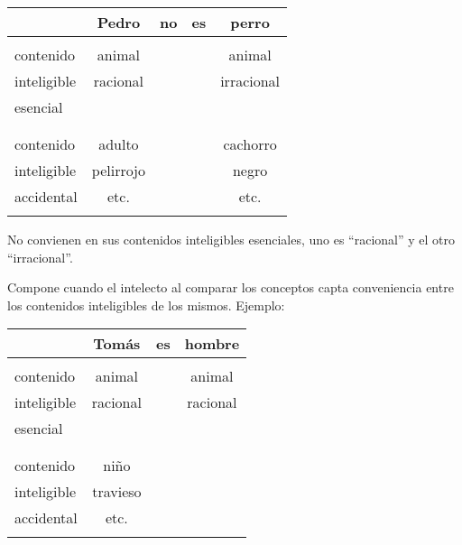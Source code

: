 \documentclass{article}
\begin{document}
    \begin{center}
    \begin{tabular}{|l|cccc|} \hline
                                 & Pedro     & no & es & perro      \\ \hline
                     &           &    &   &            \\ 
        contenido    & animal    &    &   & animal     \\
        inteligible  & racional  &    &   & irracional \\
        esencial     &           &    &   &            \\
                     &           &    &   &            \\ \hline
                     &           &    &   &            \\ 
        contenido    & adulto    &    &   & cachorro   \\
        inteligible  & pelirrojo &    &   & negro      \\
        accidental   & etc.      &    &   & etc.       \\
                     &           &    &   &            \\ \hline
    \end{tabular} 
    \end{center}
    
No convienen en sus contenidos inteligibles esenciales, uno es ``racional'' y el otro ``irracional''.
\par Compone cuando el intelecto al comparar los conceptos capta conveniencia entre  los contenidos inteligibles de los mismos. Ejemplo: \\


\begin{center}
    \begin{tabular}{|l|ccc|} \hline
                                 & Tomás     & es    & hombre   \\ \hline
                     &           &       &          \\ 
        contenido    & animal    &       & animal   \\
        inteligible  & racional  &       & racional \\
        esencial      &           &       &          \\
                      &           &       &          \\ \hline
                      &           &       &          \\ 
        contenido     & niño      &       &          \\
        inteligible   & travieso  &       &          \\
        accidental    & etc.      &       &          \\
                      &           &       &          \\ \hline
    \end{tabular}
    \end{center}
\end{document}
